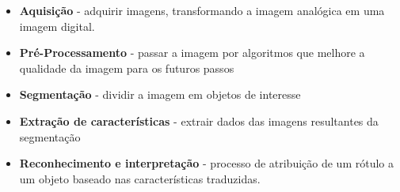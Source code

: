 \begin{question}

	\begin{itemize}
		\item \textbf{Aquisição} - adquirir imagens, transformando a imagem
		analógica em uma imagem digital.
		\item \textbf{Pré-Processamento} - passar a imagem por algoritmos que 
		melhore a qualidade da imagem para os futuros passos
		\item \textbf{Segmentação} - dividir a imagem em objetos de interesse
		\item \textbf{Extração de características} - extrair dados das imagens 
		resultantes da segmentação
		\item \textbf{Reconhecimento e interpretação} - processo de atribuição 
		de um rótulo a um objeto baseado nas características traduzidas.
	\end{itemize}
	
\end{question}
